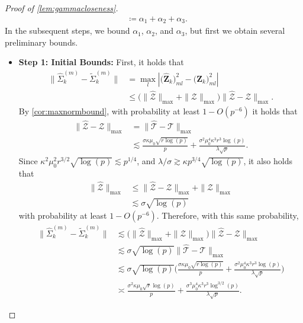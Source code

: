 \documentclass[10pt]{article}
\newcommand{\0}{{\mathbf{0}}}
\newcommand{\1}{{\mathbf{1}}}
\renewcommand{\tilde}{\widetilde}
\renewcommand{\hat}{\widehat}
\renewcommand{\hat}{\widehat}
\begin{document}
\begin{proof}[Proof of \cref{lem:gammacloseness}]
\begin{align*}
   &\coloneqq \alpha_1 + \alpha_2 + \alpha_3.
\end{align*}
In the subsequent steps, we bound $\alpha_1$, $\alpha_2$, and $\alpha_3$, but first we obtain several preliminary bounds.
\begin{itemize}
    \item \textbf{Step 1: Initial Bounds:} First, it holds that
\begin{align*}
\| \hat \Sigma^{(m)}_k - \tilde \Sigma^{(m)}_k \| &= \max_{l} |  \big(\mathbf{\hat Z}_k\big)_{ml}^2 - \big(\mathbf{ Z}_k\big)_{ml}^2  | \\
    &\leq \bigg( \| \mathcal{\hat Z} \|_{\max} + \| \mathcal{Z} \|_{\max} \bigg) \| \mathcal{\hat Z} - \mathcal{Z} \|_{\max}.
\end{align*}
By \cref{cor:maxnormbound}, with probability at least $1 - O(p^{-6})$ it holds that
\begin{align*}
    \| \mathcal{\hat Z - Z} \|_{\max} &= \| \mathcal{\hat T - T} \|_{\max} \\
    &\lesssim \frac{\sigma \kappa \mu_{0} \sqrt{r \log (p)}}{p}+\frac{\sigma^{2} \mu_{0}^{4} \kappa^{3} r^{3} \log (p)}{\lambda \sqrt{p}}.
\end{align*}
Since $\kappa^2 \mu_0^2 r^{3/2} \sqrt{\log(p)} \lesssim p^{1/4}$, and $\lambda/\sigma \gtrsim \kappa p^{3/4} \sqrt{\log(p)}$, it also holds that
\begin{align*}
    \| \mathcal{\hat Z} \|_{\max} &\leq \| \mathcal{\hat Z - Z} \|_{\max} + \| \mathcal{Z} \|_{\max} \\
    &\lesssim \sigma \sqrt{\log(p)}
\end{align*}
with probability at least $1 - O(p^{-6})$.  Therefore, with this same probability,
\begin{align}
    \| \hat \Sigma^{(m)}_k - \tilde \Sigma^{(m)}_k \| &\lesssim \bigg( \| \mathcal{\hat Z} \|_{\max} + \| \mathcal{Z} \|_{\max} \bigg) \| \mathcal{\hat Z} - \mathcal{Z} \|_{\max} \nonumber \\
    &\lesssim \sigma \sqrt{\log(p)} \| \mathcal{\hat T - T} \|_{\max} \nonumber \\
    &\lesssim \sigma \sqrt{\log(p)} \bigg(\frac{\sigma \kappa \mu_{0} \sqrt{r \log (p)}}{p}+\frac{\sigma^{2} \mu_{0}^{4} \kappa^{3} r^{3} \log (p)}{\lambda \sqrt{p}}\bigg) \nonumber \\
    &\asymp \frac{\sigma^2 \kappa \mu_0 \sqrt{r} \log(p)}{p} + \frac{\sigma^3 \mu_0^4 \kappa^3 r^3 \log^{3/2}(p)}{\lambda \sqrt{p}}. \label{sigmahatminussigmatilde}
\end{align}

\end{itemize}
\end{proof}
\end{document}
